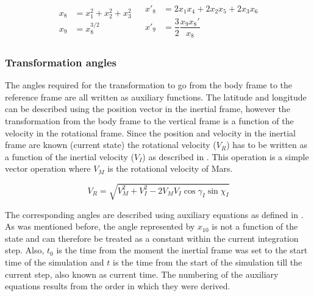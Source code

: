 \begin{align} \label{eq:gravAux}
\begin{split} 
x_{8}&=x_{1}^{2}+x_{2}^{2}+x_{3}^{2}\\
x_{9}&=x_{8}^{3/2}
\end{split} 
&
\begin{split}
x'_{8}&=2x_{1}x_{4}+2x_{2}x_{5}+2x_{3}x_{6}\\
x'_{9}&=\dfrac{3}{2}\dfrac{x_{9}x_{8}'}{x_{8}}
\end{split}
\end{align}
 
 
 \subsubsection{Transformation angles}
 \label{subsubsec:tsiTransAngl}
 The angles required for the transformation to go from the body frame to the reference frame are all written as auxiliary functions. The latitude and longitude can be described using the position vector in the inertial frame, however the transformation from the body frame to the vertical frame is a function of the velocity in the rotational frame. Since the position and velocity in the inertial frame are known (current state) the rotational velocity ($V_{R}$) has to be written as a function of the inertial velocity ($V_{I}$) as described in . This operation is a simple vector operation where $V_{M}$ is the rotational velocity of Mars.
 
\begin{equation} \label{eq:inVelToRotVel}
V_{R} = \sqrt{V_{M}^{2}+V_{I}^{2}-2V_{M}V_{I} \cos\gamma_{I} \sin\chi_{I}}
\end{equation} 
 
The corresponding angles are described using auxiliary equations as defined in . As was mentioned before, the angle represented by $x_{10}$ is not a function of the state and can therefore be treated as a constant within the current integration step. Also, $t_{0}$ is the time from the moment the inertial frame was set to the start time of the simulation and $t$ is the time from the start of the simulation till the current step, also known as current time. The numbering of the auxiliary equations results from the order in which they were derived.
 
